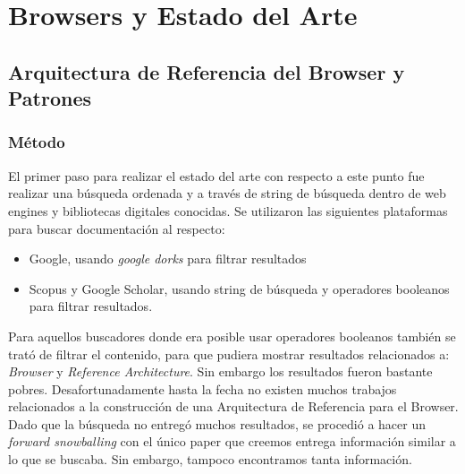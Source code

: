 \chapter{Browsers y Estado del Arte}
\label{chap4:EA}


\section{Arquitectura de Referencia del Browser y Patrones}
\label{chap3:ArqRefBrowandPatt}

\subsection{Método}
El primer paso para realizar el estado del arte con respecto a este punto fue realizar una búsqueda ordenada y a través de string de búsqueda dentro de web engines y bibliotecas digitales conocidas. Se utilizaron las siguientes plataformas para buscar documentación al respecto:
\begin{itemize}
    \item Google, usando \textit{google dorks} para filtrar resultados
    \item Scopus y Google Scholar, usando string de búsqueda y operadores booleanos para filtrar resultados.
\end{itemize}

Para aquellos buscadores donde era posible usar operadores booleanos también se trató de filtrar el contenido, para que pudiera mostrar resultados relacionados a: \textit{Browser} y \textit{Reference Architecture}. Sin embargo los resultados fueron bastante pobres. Desafortunadamente hasta la fecha no existen muchos trabajos relacionados a la construcción de una Arquitectura de Referencia para el Browser. Dado que la búsqueda no entregó muchos resultados, se procedió a hacer un \textit{forward snowballing} con el único paper que creemos entrega información similar a lo que se buscaba. Sin embargo, tampoco encontramos tanta información.


